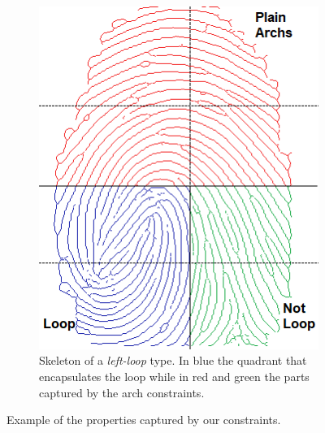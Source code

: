 \documentclass[8pt]{article}
\begin{document}
\begin{figure}
\begin{subfigure}{.38\textwidth}
	\includegraphics[width=1\linewidth]{img/loop_mod2}
	\caption{Skeleton of a \textit{left-loop} type. In blue the quadrant that encapsulates the loop while in red and green the parts captured by the arch constraints.}
	\label{fig:loop}
\end{subfigure}%
\caption{Example of the properties captured by our constraints.}
\label{fig:example}
\end{figure}











\end{document}

